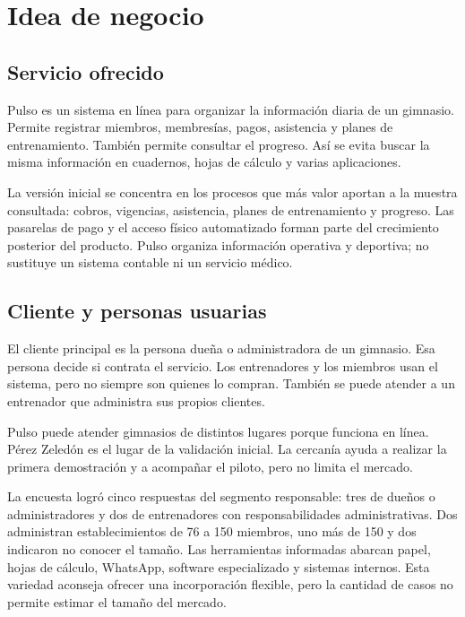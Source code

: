 \section{Idea de negocio}

\subsection{Servicio ofrecido}

Pulso es un sistema en línea para organizar la información diaria de un
gimnasio. Permite registrar miembros, membresías, pagos, asistencia y planes de
entrenamiento. También permite consultar el progreso. Así se evita buscar la
misma información en cuadernos, hojas de cálculo y varias aplicaciones.

La versión inicial se concentra en los procesos que más valor aportan a la
muestra consultada: cobros, vigencias, asistencia, planes de entrenamiento y
progreso. Las pasarelas de pago y el acceso físico automatizado forman parte
del crecimiento posterior del producto. Pulso organiza información operativa y
deportiva; no sustituye un sistema contable ni un servicio médico.

\subsection{Cliente y personas usuarias}

El cliente principal es la persona dueña o administradora de un gimnasio. Esa
persona decide si contrata el servicio. Los entrenadores y los miembros usan el
sistema, pero no siempre son quienes lo compran. También se puede atender a un
entrenador que administra sus propios clientes.

Pulso puede atender gimnasios de distintos lugares porque funciona en línea.
Pérez Zeledón es el lugar de la validación inicial. La cercanía ayuda a realizar
la primera demostración y a acompañar el piloto, pero no limita el mercado.

La encuesta logró cinco respuestas del segmento responsable: tres de dueños o
administradores y dos de entrenadores con responsabilidades administrativas.
Dos administran establecimientos de 76 a 150 miembros, uno más de 150 y dos
indicaron no conocer el tamaño. Las herramientas informadas abarcan papel, hojas
de cálculo, WhatsApp, software especializado y sistemas internos. Esta variedad
aconseja ofrecer una incorporación flexible, pero la cantidad de casos no permite
estimar el tamaño del mercado.

